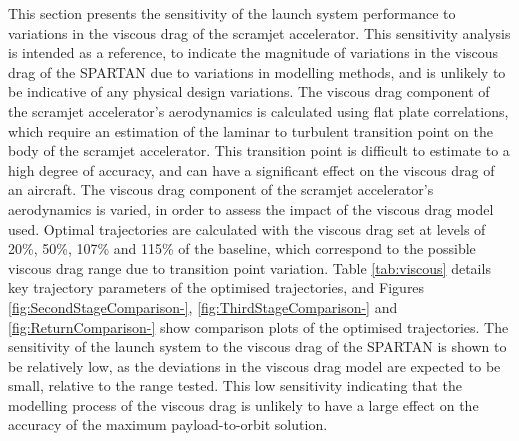 This section presents the sensitivity of the launch system performance to variations in the viscous drag of the scramjet accelerator. This sensitivity analysis is intended as a reference, to indicate the magnitude of variations in the viscous drag of the SPARTAN due to variations in modelling methods, and is unlikely to be indicative of any physical design variations.
The viscous drag component of the scramjet accelerator's aerodynamics is calculated using flat plate correlations, which require an estimation of the laminar to turbulent transition point on the body of the scramjet accelerator\cite{Ward2018}. This transition point is difficult to estimate to a high degree of accuracy, and can have a significant effect on the viscous drag of an aircraft\cite{Ward2018}.
The viscous drag component of the scramjet accelerator's aerodynamics is varied, in order to assess the impact of the viscous drag model used. Optimal trajectories are calculated with the viscous drag set at levels of 20\%, 50\%, 107\% and 115\% of the baseline, which correspond to the possible viscous drag range due to transition point variation. Table \ref{tab:viscous} details key trajectory parameters of the optimised trajectories, and Figures \ref{fig:SecondStageComparison-}, \ref{fig:ThirdStageComparison-} and \ref{fig:ReturnComparison-} show comparison plots of the optimised trajectories. The sensitivity of the launch system to the viscous drag of the SPARTAN is shown to be relatively low, as the deviations in the viscous drag model are expected to be small, relative to the range tested. This low sensitivity indicating that the modelling process of the viscous drag is unlikely to have a large effect on the accuracy of the maximum payload-to-orbit solution.

